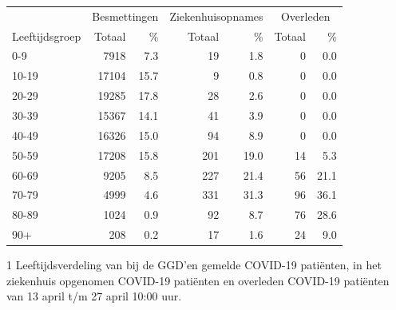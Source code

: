\documentclass[
  english,
  man,floatsintext]{apa6}
\begin{document}
\begin{table}
\centering\begingroup\fontsize{11}{13}\selectfont

\begin{threeparttable}
\begin{tabular}{lrrrrrr}
\toprule
\multicolumn{1}{c}{ } & \multicolumn{2}{c}{Besmettingen} & \multicolumn{2}{c}{Ziekenhuisopnames} & \multicolumn{2}{c}{Overleden} \\
\cmidrule(l{3pt}r{3pt}){2-3} \cmidrule(l{3pt}r{3pt}){4-5} \cmidrule(l{3pt}r{3pt}){6-7}
Leeftijdsgroep & Totaal & \% & Totaal & \% & Totaal & \%\\
\midrule
0-9 & 7918 & 7.3 & 19 & 1.8 & 0 & 0.0\\
10-19 & 17104 & 15.7 & 9 & 0.8 & 0 & 0.0\\
20-29 & 19285 & 17.8 & 28 & 2.6 & 0 & 0.0\\
30-39 & 15367 & 14.1 & 41 & 3.9 & 0 & 0.0\\
40-49 & 16326 & 15.0 & 94 & 8.9 & 0 & 0.0\\
50-59 & 17208 & 15.8 & 201 & 19.0 & 14 & 5.3\\
60-69 & 9205 & 8.5 & 227 & 21.4 & 56 & 21.1\\
70-79 & 4999 & 4.6 & 331 & 31.3 & 96 & 36.1\\
80-89 & 1024 & 0.9 & 92 & 8.7 & 76 & 28.6\\
90+ & 208 & 0.2 & 17 & 1.6 & 24 & 9.0\\
\bottomrule
\end{tabular}
\begin{tablenotes}
\item[1] Leeftijdsverdeling van bij de GGD’en gemelde COVID-19 patiënten, in het ziekenhuis opgenomen COVID-19 patiënten en overleden COVID-19 patiënten van 13 april t/m 27 april 10:00 uur.
\end{tablenotes}
\end{threeparttable}
\endgroup{}
\end{table}

\newpage
\end{document}
